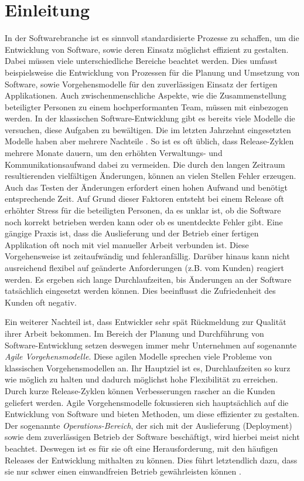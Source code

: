 \chapter{Einleitung}
In der Softwarebranche ist es sinnvoll standardisierte Prozesse zu schaffen, um die Entwicklung von Software, sowie deren Einsatz möglichst effizient zu gestalten. Dabei müssen viele unterschiedliche Bereiche beachtet werden. Dies umfasst beispielsweise die Entwicklung von Prozessen für die Planung und Umsetzung von Software, sowie Vorgehensmodelle für den zuverlässigen Einsatz der fertigen Applikationen. Auch zwischenmenschliche Aspekte, wie die Zusammenstellung beteiligter Personen zu einem hochperformanten Team, müssen mit einbezogen werden. In der klassischen Software-Entwicklung gibt es bereits viele Modelle die versuchen, diese Aufgaben zu bewältigen. Die im letzten Jahrzehnt eingesetzten Modelle haben aber mehrere Nachteile \cite{humble2010}. So ist es oft üblich, dass Release-Zyklen mehrere Monate dauern, um den erhöhten Verwaltungs- und Kommunikationsaufwand dabei zu vermeiden. Die durch den langen Zeitraum resultierenden vielfältigen Änderungen, können an vielen Stellen Fehler erzeugen. Auch das Testen der Änderungen erfordert einen hohen Aufwand und benötigt entsprechende Zeit. Auf Grund dieser Faktoren entsteht bei einem Release oft erhöhter Stress für die beteiligten Personen, da es unklar ist, ob die Software noch korrekt betrieben werden kann oder ob es unentdeckte Fehler gibt. Eine gängige Praxis ist, dass die Auslieferung und der Betrieb einer fertigen Applikation oft noch mit viel manueller Arbeit verbunden ist. Diese Vorgehensweise ist zeitaufwändig und fehleranfällig. Darüber hinaus kann nicht ausreichend flexibel auf geänderte Anforderungen (z.B. vom Kunden) reagiert werden. Es ergeben sich lange Durchlaufzeiten, bis Änderungen an der Software tatsächlich eingesetzt werden können. Dies beeinflusst die Zufriedenheit des Kunden oft negativ. 

Ein weiterer Nachteil ist, dass Entwickler sehr spät Rückmeldung zur Qualität ihrer Arbeit bekommen. Im Bereich der Planung und Durchführung von Software-Entwicklung setzen deswegen immer mehr Unternehmen auf sogenannte \textit{Agile Vorgehensmodelle}. Diese agilen Modelle sprechen viele Probleme von klassischen Vorgehensmodellen an. Ihr Hauptziel ist es, Durchlaufzeiten so kurz wie möglich zu halten und dadurch möglichst hohe Flexibilität zu erreichen. Durch kurze Release-Zyklen können Verbesserungen rascher an die Kunden geliefert werden. Agile Vorgehensmodelle fokussieren sich hauptsächlich auf die Entwicklung von Software und bieten Methoden, um diese effizienter zu gestalten. Der sogenannte \textit{Operations-Bereich}, der sich mit der Auslieferung (Deployment) sowie dem zuverlässigen Betrieb der Software beschäftigt, wird hierbei meist nicht beachtet. Deswegen ist es für sie oft eine Herausforderung, mit den häufigen Releases der Entwicklung mithalten zu können. Dies führt letztendlich dazu, dass sie nur schwer einen einwandfreien Betrieb gewährleisten können \cite{humble2010, humble2014}.

